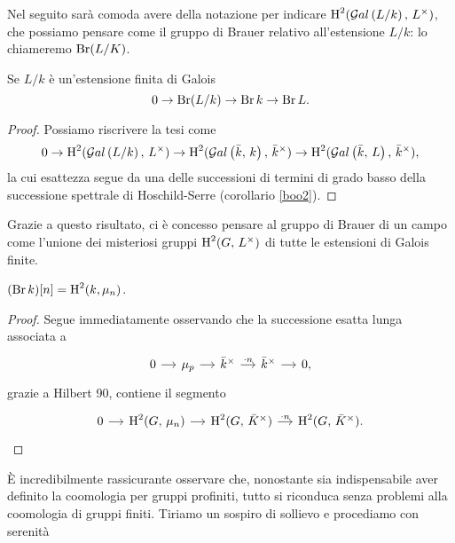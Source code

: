 Nel seguito sarà comoda avere della notazione per indicare $ \operatorname{H}^2(\mathcal{G}al\left( L/k \right), \, L^\times) $, che possiamo pensare come il gruppo di Brauer relativo all'estensione $ L/k $: lo chiameremo $ \operatorname{Br}(L/K) $.

\begin{lemma}\label{stronzetto}
	Se $ L/k $ è un'estensione finita di Galois
	\[ 0 \to \operatorname{Br}(L/k) \to \operatorname{Br} k \to \operatorname{Br} L.  \]
\end{lemma}
\begin{proof}
	Possiamo riscrivere la tesi come
	\[ 0 \to \operatorname{H}^2(\mathcal{G}al\left( L/k \right), \, L^\times) \to \operatorname{H}^2(\mathcal{G}al\left( \bar{k}, \, k \right), \, \bar{k}^\times) \to \operatorname{H}^2(\mathcal{G}al\left( \bar{k}, \, L \right), \, \bar{k}^\times), \]
	la cui esattezza segue da una delle successioni di termini di grado basso della successione spettrale di Hoschild-Serre (corollario \ref{boo2}).
\end{proof}

Grazie a questo risultato, ci è concesso pensare al gruppo di Brauer di un campo come l'unione dei misteriosi gruppi $ \operatorname{H}^2(G, \, L^\times) $ di tutte le estensioni di Galois finite.


\begin{lemma} \label{torsione del brauer}
	$ (\operatorname{Br} k) [n] = \operatorname{H}^2(k, \mu_n) $.
\end{lemma}
\begin{proof}
	Segue immediatamente osservando che la successione esatta lunga associata a 
	\[\begin{tikzcd}[column sep = small]
	0 \rar
	& \mu_p \rar
	& \bar{k}^\times \rar["\cdot n"]
	& \bar{k}^\times \rar
	& 0,
	\end{tikzcd}  \]
	grazie a Hilbert 90, contiene il segmento
	\[\begin{tikzcd}[column sep = small]
	0 \rar
	& \HH^2(G, \, \mu_n) \rar
	& \HH^2(G, \, \bar{\K}^\times) \rar["\cdot n"]
	& \HH^2(G, \, \bar{\K}^\times).
	\end{tikzcd}  \]
\end{proof}

\begin{profinite}
	È incredibilmente rassicurante osservare che, nonostante sia indispensabile aver definito la coomologia per gruppi profiniti, tutto si riconduca senza problemi alla coomologia di gruppi finiti. Tiriamo un sospiro di sollievo e procediamo con serenità
\end{profinite}

